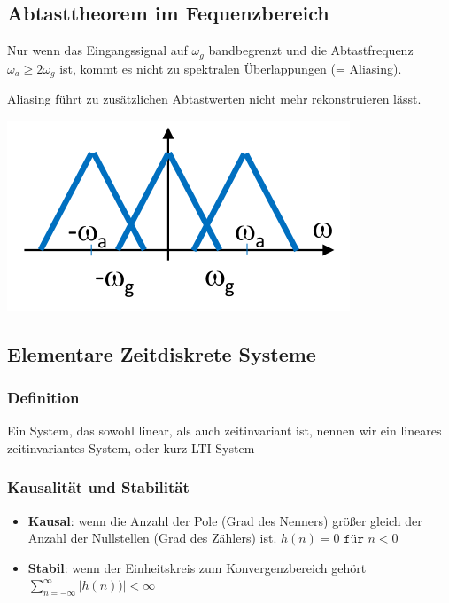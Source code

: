 \subsection{Abtasttheorem im Fequenzbereich}
Nur wenn das Eingangssignal auf $\omega_g$ bandbegrenzt und die Abtastfrequenz $\omega_a  \geq
	2\omega_g$ ist, kommt es nicht zu spektralen Überlappungen (= Aliasing).

Aliasing führt zu zusätzlichen Abtastwerten nicht mehr rekonstruieren lässt.

\centering
\includegraphics[width=0.5\columnwidth]{Bilder/Abtasttheorem_Uebrlappung}

\raggedright
\vspace{-1.5em}
\subsection{Elementare Zeitdiskrete Systeme}
\subsubsection{Definition}
Ein System, das sowohl linear, als auch zeitinvariant ist, nennen wir ein
lineares zeitinvariantes System, oder kurz LTI-System

\subsubsection{Kausalität und Stabilität}
\begin{itemize}
	\item \textbf{Kausal}:
	      wenn die Anzahl der Pole (Grad des Nenners) größer gleich
	      der Anzahl der Nullstellen (Grad des Zählers) ist.
	      $ h(n) = 0 \texttt{ für } n<0 $
	\item \textbf{Stabil}:
	      wenn der Einheitskreis zum Konvergenzbereich gehört
	      $ \sum_{n=-\infty}^{\infty}|h(n))| < \infty $
\end{itemize}

\begin{center}
\end{center}

